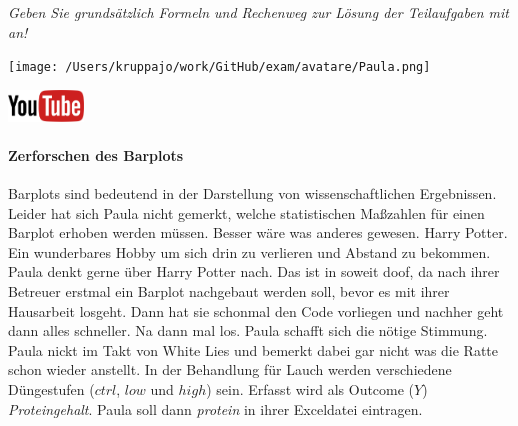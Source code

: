 \documentclass[a4paper, 9pt]{scrartcl}\usepackage[]{graphicx}\usepackage[]{xcolor}
\begin{document}
\textit{Geben Sie grundsätzlich Formeln und Rechenweg zur Lösung der Teilaufgaben mit an!} \\[1Ex]
 

 
\begin{minipage}[t]{0.5\textwidth}
\texttt{[image: /Users/kruppajo/work/GitHub/exam/avatare/Paula.png]}
\end{minipage}
\begin{minipage}[t]{0.5\textwidth}
\hfill
\href{https://youtu.be/t0WYa_LVc5o}{\includegraphics[width = 2cm]{img/youtube}}
\end{minipage}
\vspace{-3ex}



\paragraph{Zerforschen des Barplots}

Barplots sind bedeutend in der Darstellung von wissenschaftlichen Ergebnissen. Leider hat sich Paula nicht gemerkt, welche statistischen Maßzahlen für einen Barplot erhoben werden müssen. Besser wäre was anderes gewesen. Harry Potter. Ein wunderbares Hobby um sich drin zu verlieren und Abstand zu bekommen. Paula denkt gerne über Harry Potter nach. Das ist in soweit doof, da nach ihrer Betreuer erstmal ein Barplot nachgebaut werden soll, bevor es mit ihrer Hausarbeit losgeht. Dann hat sie schonmal den \Rlogo Code vorliegen und nachher geht dann alles schneller. Na dann mal los. Paula schafft sich die nötige Stimmung. Paula nickt im Takt von White Lies und bemerkt dabei gar nicht was die Ratte schon wieder anstellt. In der Behandlung für Lauch werden verschiedene Düngestufen ($ctrl$, $low$ und $high$) sein. Erfasst wird als Outcome ($Y$) \textit{Proteingehalt}. Paula soll dann \textit{protein} in ihrer Exceldatei eintragen.
\end{document}
